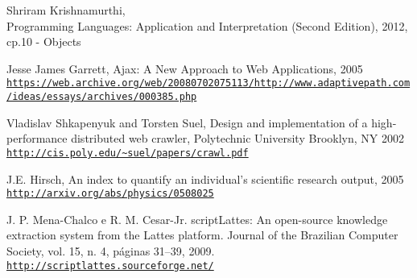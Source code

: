 \begin{thebibliography}{99}
 Shriram Krishnamurthi,\\ Programming Languages: Application and Interpretation (Second Edition), 2012, cp.10 - Objects

 Jesse James Garrett, Ajax: A New Approach to Web Applications, 2005
\\ 
\mbox{}\hfill\texttt{\url{https://web.archive.org/web/20080702075113/http://www.adaptivepath.com/ideas/essays/archives/000385.php}}

 Vladislav Shkapenyuk and Torsten Suel, Design and implementation of a high-performance
distributed web crawler, Polytechnic University Brooklyn, NY 2002
\mbox{}\hfill\texttt{\url{http://cis.poly.edu/~suel/papers/crawl.pdf}}


 J.E. Hirsch, An index to quantify an individual's scientific research output, 2005\\
\mbox{}\hfill\texttt{\url{http://arxiv.org/abs/physics/0508025}}

 J. P. Mena-Chalco e R. M. Cesar-Jr. scriptLattes: An open-source knowledge extraction system from the Lattes platform. Journal of the Brazilian Computer Society, vol. 15, n. 4, páginas 31--39, 2009.\\
\mbox{}\hfill\texttt{\url{http://scriptlattes.sourceforge.net/}}


\end{thebibliography}
